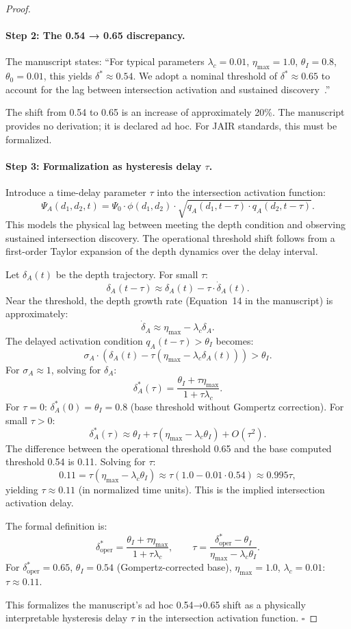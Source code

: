 \begin{proof}
\paragraph{Step 2: The 0.54 → 0.65 discrepancy.}
The manuscript states: ``For typical parameters $\lambda_c = 0.01$,
$\eta_{\max} = 1.0$, $\theta_I = 0.8$, $\theta_0 = 0.01$, this yields
$\delta^* \approx 0.54$. We adopt a nominal threshold of $\delta^* \approx 0.65$
to account for the lag between intersection activation and sustained
discovery~\citep{redhardt2025}.''

The shift from 0.54 to 0.65 is an increase of approximately 20\%.
The manuscript provides no derivation; it is declared ad hoc. For JAIR
standards, this must be formalized.

\paragraph{Step 3: Formalization as hysteresis delay $\tau$.}
Introduce a time-delay parameter $\tau$ into the intersection activation
function:
\[
\Psi_A(d_1,d_2,t) = \Psi_0 \cdot \phi(d_1,d_2) \cdot
\sqrt{q_A(d_1, t - \tau) \cdot q_A(d_2, t - \tau)}.
\]
This models the physical lag between meeting the depth condition and
observing sustained intersection discovery. The operational threshold
shift follows from a first-order Taylor expansion of the depth dynamics
over the delay interval.

Let $\delta_A(t)$ be the depth trajectory. For small $\tau$:
\[
\delta_A(t - \tau) \approx \delta_A(t) - \tau \cdot \dot{\delta}_A(t).
\]
Near the threshold, the depth growth rate (Equation~14 in the manuscript)
is approximately:
\[
\dot{\delta}_A \approx \eta_{\max} - \lambda_c \delta_A.
\]
The delayed activation condition $q_A(t - \tau) > \theta_I$ becomes:
\[
\sigma_A \cdot (\delta_A(t) - \tau(\eta_{\max} - \lambda_c \delta_A(t))) > \theta_I.
\]
For $\sigma_A \approx 1$, solving for $\delta_A$:
\[
\delta_A^*(\tau) = \frac{\theta_I + \tau \eta_{\max}}{1 + \tau \lambda_c}.
\]
For $\tau = 0$: $\delta_A^*(0) = \theta_I = 0.8$ (base threshold without
Gompertz correction). For small $\tau > 0$:
\[
\delta_A^*(\tau) \approx \theta_I + \tau(\eta_{\max} - \lambda_c \theta_I) + O(\tau^2).
\]
The difference between the operational threshold 0.65 and the base
computed threshold 0.54 is 0.11. Solving for $\tau$:
\[
0.11 = \tau(\eta_{\max} - \lambda_c \theta_I) \approx \tau(1.0 - 0.01 \cdot 0.54) \approx 0.995\tau,
\]
yielding $\tau \approx 0.11$ (in normalized time units). This is the
implied intersection activation delay.

The formal definition is:
\[
\boxed{\delta_{\text{oper}}^* = \frac{\theta_I + \tau \eta_{\max}}{1 + \tau \lambda_c},
\qquad \tau = \frac{\delta_{\text{oper}}^* - \theta_I}{\eta_{\max} - \lambda_c \theta_I}}.
\]
For $\delta_{\text{oper}}^* = 0.65$, $\theta_I = 0.54$ (Gompertz-corrected
base), $\eta_{\max} = 1.0$, $\lambda_c = 0.01$: $\tau \approx 0.11$.

This formalizes the manuscript's ad hoc 0.54→0.65 shift as a physically
interpretable hysteresis delay $\tau$ in the intersection activation
function. $\square$
\end{proof}

